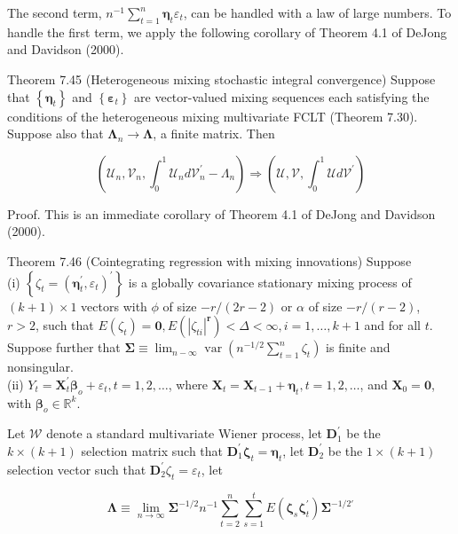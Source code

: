 \documentclass[10pt]{article}
\begin{document}
The second term, $n^{-1} \sum_{t=1}^{n} \boldsymbol{\eta}_{t} \varepsilon_{t}$, can be handled with a law of large numbers. To handle the first term, we apply the following corollary of Theorem 4.1 of DeJong and Davidson (2000).

Theorem 7.45 (Heterogeneous mixing stochastic integral convergence) Suppose that $\left\{\boldsymbol{\eta}_{t}\right\}$ and $\left\{\boldsymbol{\varepsilon}_{t}\right\}$ are vector-valued mixing sequences each satisfying the conditions of the heterogeneous mixing multivariate FCLT (Theorem 7.30). Suppose also that $\mathbf{\Lambda}_{n} \rightarrow \mathbf{\Lambda}$, a finite matrix. Then

$$
\left(\mathcal{U}_{n}, \mathcal{V}_{n}, \int_{0}^{1} \mathcal{U}_{n} d \mathcal{V}_{n}^{\prime}-\Lambda_{n}\right) \Rightarrow\left(\mathcal{U}, \mathcal{V}, \int_{0}^{1} \mathcal{U} d \mathcal{V}^{\prime}\right)
$$

Proof. This is an immediate corollary of Theorem 4.1 of DeJong and Davidson (2000).

Theorem 7.46 (Cointegrating regression with mixing innovations) Suppose\\
(i) $\left\{\zeta_{t}=\left(\boldsymbol{\eta}_{t}^{\prime}, \varepsilon_{t}\right)^{\prime}\right\}$ is a globally covariance stationary mixing process of $(k+1) \times 1$ vectors with $\phi$ of size $-r /(2 r-2)$ or $\alpha$ of size $-r /(r-2)$,\\
$r>2$, such that $E\left(\zeta_{t}\right)=\mathbf{0}, E\left(\left|\zeta_{t i}\right|^{\boldsymbol{r}}\right)<\Delta<\infty, i=1, \ldots, k+1$ and for all $t$. Suppose further that $\mathbf{\Sigma} \equiv \lim _{n-\infty} \operatorname{var}\left(n^{-1 / 2} \sum_{t=1}^{n} \zeta_{t}\right)$ is finite and nonsingular.\\
(ii) $Y_{t}=\mathbf{X}_{t}^{\prime} \boldsymbol{\beta}_{o}+\varepsilon_{t}, t=1,2, \ldots$, where $\mathbf{X}_{t}=\mathbf{X}_{t-1}+\boldsymbol{\eta}_{t}, t=1,2, \ldots$, and $\mathbf{X}_{0}=\mathbf{0}$, with $\boldsymbol{\beta}_{o} \in \mathbb{R}^{k}$.

Let $\mathcal{W}$ denote a standard multivariate Wiener process, let $\mathbf{D}_{1}^{\prime}$ be the $k \times(k+1)$ selection matrix such that $\mathbf{D}_{1}^{\prime} \boldsymbol{\zeta}_{t}=\boldsymbol{\eta}_{t}$, let $\mathbf{D}_{2}^{\prime}$ be the $1 \times(k+1)$ selection vector such that $\mathbf{D}_{2}^{\prime} \zeta_{t}=\varepsilon_{t}$, let

$$
\mathbf{\Lambda} \equiv \lim _{n \rightarrow \infty} \boldsymbol{\Sigma}^{-1 / 2} n^{-1} \sum_{t=2}^{n} \sum_{s=1}^{t} E\left(\boldsymbol{\zeta}_{s} \boldsymbol{\zeta}_{t}^{\prime}\right) \boldsymbol{\Sigma}^{-1 / 2 \prime}
$$
\end{document}
